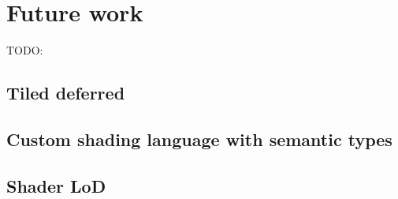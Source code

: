 
\chapter{ Future work }
\label{Chapter8}

TODO: 

\section{Tiled deferred}
\section{Custom shading language with semantic types}
\section{Shader LoD}

